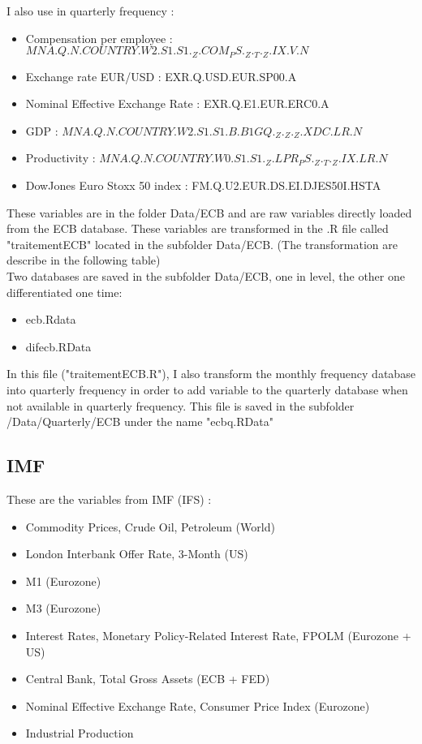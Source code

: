 \documentclass[11pt,a4paper]{article}
\begin{document}
I also use in quarterly frequency : 

\begin{itemize}
\item Compensation per employee : $MNA.Q.N.COUNTRY.W2.S1.S1._Z.COM_PS._Z._T._Z.IX.V.N$
\item Exchange rate EUR/USD : EXR.Q.USD.EUR.SP00.A
\item Nominal Effective Exchange Rate : EXR.Q.E1.EUR.ERC0.A
\item GDP : $MNA.Q.N.COUNTRY.W2.S1.S1.B.B1GQ._Z._Z._Z.XDC.LR.N$
\item Productivity : $MNA.Q.N.COUNTRY.W0.S1.S1._Z.LPR_PS._Z._T._Z.IX.LR.N$
\item DowJones Euro Stoxx 50 index : FM.Q.U2.EUR.DS.EI.DJES50I.HSTA

\end{itemize}

\vspace{0.5cm}

These variables are in the folder Data/ECB and are raw variables directly loaded from the ECB database. These variables are transformed in the .R file called "traitementECB" located in the subfolder Data/ECB. (The transformation are describe in the following table) \\

Two databases are saved in the subfolder Data/ECB, one in level, the other one differentiated one time: 

\begin{itemize}
\item ecb.Rdata 
\item difecb.RData 
\end{itemize}

\vspace{0.5cm}

In this file ("traitementECB.R"), I also transform the monthly frequency database into quarterly  frequency in order to add variable to the quarterly database when not available in quarterly frequency. This file is saved in the subfolder /Data/Quarterly/ECB under the name "ecbq.RData" 






\subsection{IMF}

These are the variables from IMF (IFS) :
\begin{itemize}
\item Commodity Prices, Crude Oil, Petroleum (World)
\item London Interbank Offer Rate, 3-Month (US)
\item M1 (Eurozone)
\item M3 (Eurozone)
\item Interest Rates, Monetary Policy-Related Interest Rate, FPOLM (Eurozone + US)
\item Central Bank, Total Gross Assets (ECB + FED)
\item Nominal Effective Exchange Rate, Consumer Price Index (Eurozone)
\item Industrial Production
\end{itemize}
\end{document}
